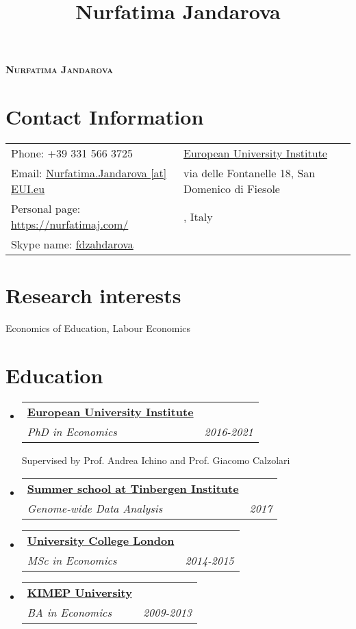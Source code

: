 \documentclass[a4, 11pt]{article}
\title{Nurfatima Jandarova}
\makeatletter
\newcommand{\resumeSubheading}[4]{
      \vspace{-2pt}\item
        \begin{tabular*}{0.97\textwidth}[t]{l@{\extracolsep{\fill}}r}
          \textbf{#1} & #2 \\
          \textit{\small#3} & \textit{\small #4} \\
        \end{tabular*}
    }
\newcommand{\resumeSubHeadingListStart}{\begin{itemize}[leftmargin=0.15in, label={}]}
\newcommand{\resumeSubHeadingListEnd}{\end{itemize}}
\makeatother
\begin{document}
    \begin{center}
        \textbf{\Huge \scshape Nurfatima Jandarova} \\ \vspace{1pt}
    \end{center}


    \section*{Contact Information}
    \begin{table}[H]
      \begin{tabular}{>{\raggedright\arraybackslash}p{0.5\linewidth}>{\raggedleft\arraybackslash}p{0.5\linewidth}}Phone: +39 331 566 3725 &\href{https://www.eui.eu/}{European University Institute}\\
          Email: \href{mailto:Nurfatima.Jandarova [at] EUI.eu}{Nurfatima.Jandarova [at] EUI.eu}
        & via delle Fontanelle 18, San Domenico di Fiesole\\
        Personal page: \href{https://nurfatimaj.com/}{https://nurfatimaj.com/} & 50014, Italy\\
        Skype name: \href{skype:fdzahdarova?call}{fdzahdarova} &
      \end{tabular}
    \end{table}

    \section{Research interests}Economics of Education, Labour Economics

    \section{Education}\resumeSubHeadingListStart
          \resumeSubheading
            {\href{https://www.eui.eu}{European University Institute} }
            {}
            {PhD in Economics}
            { 2016-2021 }Supervised by Prof. Andrea Ichino and Prof. Giacomo Calzolari
          \resumeSubheading
            {\href{https://www.tinbergen.nl/home}{Summer school at Tinbergen Institute} }
            {}
            {Genome-wide Data Analysis}
            { 2017 }
          \resumeSubheading
            {\href{https://www.ucl.ac.uk}{University College London} }
            {}
            {MSc in Economics}
            { 2014-2015 }
          \resumeSubheading
            {\href{https://www.kimep.kz/en}{KIMEP University} }
            {}
            {BA in Economics}
            { 2009-2013 }
      \resumeSubHeadingListEnd
\end{document}
